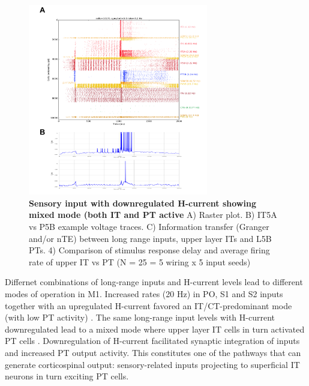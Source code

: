 \begin{figure}[!h]  %
\centering
\includegraphics[width=0.7\textwidth]{figs/mixed_mode.png}
\caption{{\bf Sensory input with downregulated H-current showing mixed mode (both IT and PT active}
A) Raster plot. B) IT5A vs P5B example voltage traces. C) Information transfer (Granger and/or nTE) between long range inputs, upper layer ITs and L5B PTs.  4) Comparison of stimulus response delay and average firing rate of upper IT vs PT (N = 25 = 5 wiring x 5 input seeds)
}
\label{fig_mixed_mode}
\end{figure}

Differnet combinations of long-range inputs and H-current levels lead to different modes of operation in M1. Increased rates (20 Hz) in PO, S1 and S2 inputs together with an upregulated H-current favored an IT/CT-predominant mode (with low PT activity) . The same long-range input levels with H-current downregulated lead to a mixed mode where upper layer IT cells in turn activated PT cells . Downregulation of H-current facilitated synaptic integration of inputs and increased PT output activity. This constitutes one of the pathways that can generate corticospinal output: sensory-related inputs projecting to superficial IT neurons in turn exciting PT cells.



